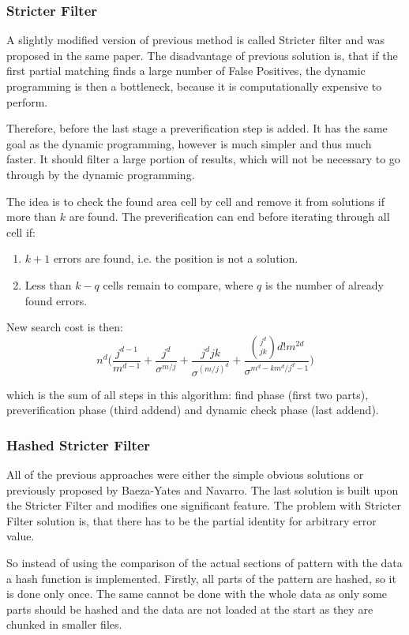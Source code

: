 \subsubsection{Stricter Filter}\label{sfapm}
A slightly modified version of previous method is called Stricter filter and was proposed in the same paper. The disadvantage of previous solution is, that if the first partial matching finds a large number of False Positives, the dynamic programming is then a bottleneck, because it is computationally expensive to perform.

Therefore, before the last stage a preverification step is added. It has the same goal as the dynamic programming, however is much simpler and thus much faster. It should filter a large portion of results, which will not be necessary to go through by the dynamic programming.

The idea is to check the found area cell by cell and remove it from solutions if more than $k$ are found. The preverification can end before iterating through all cell if:

\begin{enumerate}
\item $k+1$ errors are found, i.e. the position is not a solution.
\item Less than $k - q$ cells remain to compare, where $q$ is the number of already found errors.
\end{enumerate}

New search cost is then: $$ n^d \Big(\frac{j^{d-1}}{m^{d-1}} + \frac{j^d}{\sigma^{m/j}} + \frac{j^djk}{\sigma^{(m/j)^d}} + \frac{{j^d \choose jk} d! m^{2d} }{\sigma^{m^d - km^d/j^d -1}}\Big) $$

which is the sum of all steps in this algorithm: find phase (first two parts), preverification phase (third addend) and dynamic check phase (last addend).
\subsubsection{Hashed Stricter Filter }\label{hsfapm}
All of the previous approaches were either the simple obvious solutions or previously proposed by Baeza-Yates and Navarro. The last solution is built upon the Stricter Filter and modifies one significant feature. The problem with Stricter Filter solution is, that there has to be the partial identity for arbitrary error value.

So instead of using the comparison of the actual sections of pattern with the data a hash function is implemented. Firstly, all parts of the pattern are hashed, so it is done only once. The same cannot be done with the whole data as only some parts should be hashed and the data are not loaded at the start as they are chunked in smaller files.

